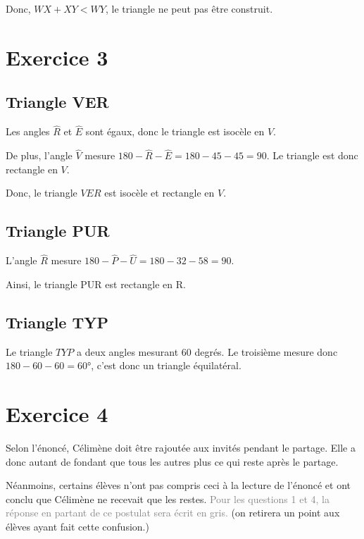 Donc, $WX+XY<WY$, le triangle ne peut pas être construit.

\section*{Exercice 3}

\subsection*{Triangle VER} 

Les angles $\widehat{R}$ et $\widehat{E}$ sont égaux, donc le triangle est isocèle en $V$.

De plus, l'angle $\widehat{V}$ mesure $180-\widehat{R}-\widehat{E}=180-45-45=90$. Le triangle est donc rectangle en $V$.

Donc, le triangle $VER$ est isocèle et rectangle en $V$.


\subsection*{Triangle PUR} 

L'angle $\widehat{R}$ mesure $180-\widehat{P}-\widehat{U}=180-32-58=90$.

Ainsi, le triangle PUR est rectangle en R.

\subsection*{Triangle TYP} 

Le triangle $TYP$ a deux angles mesurant 60 degrés. Le troisième mesure donc $180-60-60=60$°, c'est donc un triangle équilatéral.




\section*{Exercice 4}


Selon l'énoncé, Célimène doit être rajoutée aux invités pendant le partage. Elle a donc autant de fondant que tous les autres plus ce qui reste après le partage. 

Néanmoins, certains élèves n'ont pas compris ceci à la lecture de l'énoncé et ont conclu que Célimène ne recevait que les restes. \textcolor{gray}{Pour les questions 1 et 4, la réponse en partant de ce postulat sera écrit en gris.} (on retirera un point aux élèves ayant fait cette confusion.) 

